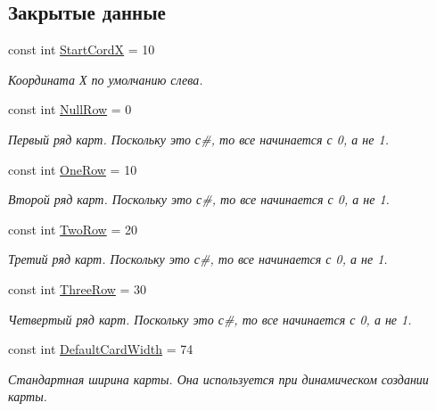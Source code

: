 \subsection*{Закрытые данные}
\begin{DoxyCompactItemize}
\item 
const int \hyperlink{class_pasyans_cover_u_w_p_1_1_game_page_a4ad4b7e54cbe7dad538eb1eb3c4f9690}{Start\+CordX} = 10
\begin{DoxyCompactList}\small\item\em Координата Х по умолчанию слева. \end{DoxyCompactList}\item 
const int \hyperlink{class_pasyans_cover_u_w_p_1_1_game_page_ace653fbd9e4a20124d9591f75748738e}{Null\+Row} = 0
\begin{DoxyCompactList}\small\item\em Первый ряд карт. Поскольку это с\#, то все начинается с 0, а не 1. \end{DoxyCompactList}\item 
const int \hyperlink{class_pasyans_cover_u_w_p_1_1_game_page_a120ab62da97a1692416b0840ef726e49}{One\+Row} = 10
\begin{DoxyCompactList}\small\item\em Второй ряд карт. Поскольку это с\#, то все начинается с 0, а не 1. \end{DoxyCompactList}\item 
const int \hyperlink{class_pasyans_cover_u_w_p_1_1_game_page_a815d76a3c2a50ae107f10275e2574285}{Two\+Row} = 20
\begin{DoxyCompactList}\small\item\em Третий ряд карт. Поскольку это с\#, то все начинается с 0, а не 1. \end{DoxyCompactList}\item 
const int \hyperlink{class_pasyans_cover_u_w_p_1_1_game_page_aabcd571572c00c2e8f761cf220555357}{Three\+Row} = 30
\begin{DoxyCompactList}\small\item\em Четвертый ряд карт. Поскольку это с\#, то все начинается с 0, а не 1. \end{DoxyCompactList}\item 
const int \hyperlink{class_pasyans_cover_u_w_p_1_1_game_page_a11ecf48c9c1ae48e3b1bf8c287cbc909}{Default\+Card\+Width} = 74
\begin{DoxyCompactList}\small\item\em Стандартная ширина карты. Она используется при динамическом создании карты. \end{DoxyCompactList}\item 

\end{DoxyCompactItemize}

